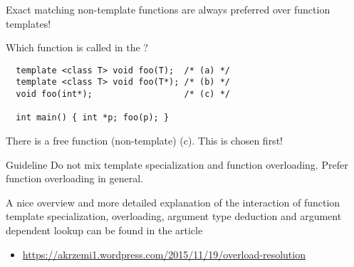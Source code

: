 Exact matching non-template functions are always preferred over function templates!

\begin{example}
  Which function is called in the ?
  \begin{verbatim}
  template <class T> void foo(T);  /* (a) */
  template <class T> void foo(T*); /* (b) */
  void foo(int*);                  /* (c) */

  int main() { int *p; foo(p); }
  \end{verbatim}
  There is a free function (non-template) (c). This is chosen first!
\end{example}

\begin{guideline}{Guideline}
  Do not mix template specialization and function overloading. Prefer function overloading in general.
\end{guideline}

\begin{rem}
  A nice overview and more detailed explanation of the interaction of function template specialization, overloading, argument type deduction and
  argument dependent lookup can be found in the article\begin{itemize}
	  \item \url{https://akrzemi1.wordpress.com/2015/11/19/overload-resolution}
  \end{itemize}
\end{rem}


